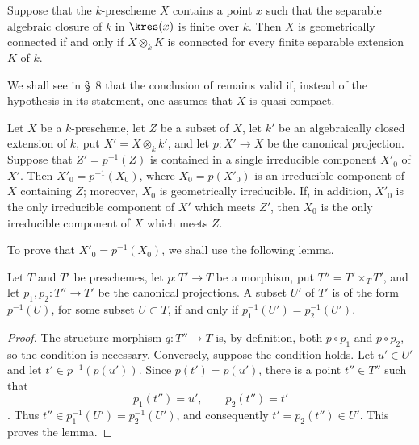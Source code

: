 
\begin{corollary}[4.5.17]
\label{IV.4.5.17}
Suppose that the $k$-prescheme $X$ contains a point $x$ such that the
separable algebraic closure of $k$ in $\kres(x)$ is finite over $k$.
Then $X$ is geometrically connected if and only if
$X\otimes_k K$ is connected for every finite separable extension
$K$ of $k$.
\end{corollary}

\begin{remark}[4.5.18]
\label{IV.4.5.18}
We shall see in \S~8  that the conclusion of
 remains valid if, instead of the hypothesis in its
statement, one assumes that $X$ is quasi-compact.
\end{remark}

\begin{proposition}[4.5.19]
\label{IV.4.5.19}
Let $X$ be a $k$-prescheme, let $Z$ be a subset of $X$, let $k'$ be
an algebraically closed extension of $k$, put $X'=X\otimes_k k'$,
and let $p:X'\to X$ be the canonical projection.
Suppose that $Z'=p^{-1}(Z)$ is contained in \textup{a single} irreducible
component $X'_0$ of $X'$.
Then $X'_0=p^{-1}(X_0)$,
where $X_0=p(X'_0)$ is an irreducible component of $X$ containing
$Z$; moreover, $X_0$ is geometrically irreducible.
If, in addition, $X'_0$ is the only irreducible component of $X'$
which \textup{meets} $Z'$, then $X_0$ is the only irreducible component of $X$
which meets $Z$.
\end{proposition}

To prove that $X'_0=p^{-1}(X_0)$, we shall use the following lemma.

\begin{lemma}[4.5.19.1]
\label{IV.4.5.19.1}
Let $T$ and $T'$ be preschemes, let $p:T'\to T$ be a morphism, put $T''=T'\times_T T'$,
and let $p_1,p_2:T''\to T'$ be the canonical projections.
A subset $U'$ of $T'$ is of the form $p^{-1}(U)$, for some subset
$U\subset T$, if and only if $p_1^{-1}(U')=p_2^{-1}(U')$.
\end{lemma}

\begin{proof}
The structure morphism $q:T''\to T$ is, by definition, both
$p\circ p_1$ and $p\circ p_2$, so the condition is necessary.
Conversely, suppose the condition holds.
Let $u'\in U'$ and let $t'\in p^{-1}(p(u'))$.
Since $p(t')=p(u')$, there is a point $t''\in T''$ such that
\[
p_1(t'')=u',\qquad p_2(t'')=t'
\]
.
Thus
$t''\in p_1^{-1}(U')=p_2^{-1}(U')$, and consequently
$t'=p_2(t'')\in U'$.
This proves the lemma.
\end{proof}

